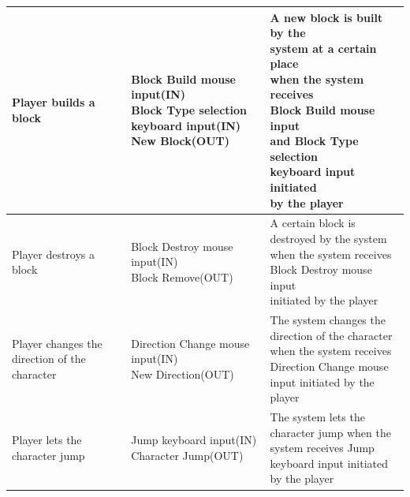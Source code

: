 \documentclass[12pt, titlepage]{article}
\begin{document}
\begin{center}
\begin{longtable}[!bpht]{|m{0.3\linewidth}|m{0.35\linewidth}|m{0.35\linewidth}|}
Player builds a block & \makecell[ml]{Block Build mouse\\ input(IN)\\ Block Type selection\\ keyboard input(IN)\\ New Block(OUT)} & \makecell[ml]{A new block is built by the\\ system at a certain place\\ when the system receives\\Block Build mouse input\\ and Block Type selection\\ keyboard input initiated\\ by the player}\\\hline

Player destroys a block & \makecell[ml]{Block Destroy mouse\\ input(IN)\\ Block Remove(OUT)} & \makecell[ml]{A certain block is\\ destroyed by the system\\ when the system receives\\ Block Destroy mouse input\\ initiated by the player}\\\hline

\makecell[ml]{Player changes the\\ direction of the\\ character} & \makecell[ml]{Direction Change mouse\\ input(IN)\\ New Direction(OUT)} & \makecell[ml]{The system changes the\\ direction of the character\\ when the system receives\\ Direction Change mouse\\ input initiated by the\\ player}\\\hline

\makecell[ml]{Player lets the\\ character jump} & \makecell[ml]{Jump keyboard input(IN)\\ Character Jump(OUT)} & \makecell[ml]{The system lets the\\ character jump when the\\ system receives Jump\\ keyboard input initiated\\ by the player}\\\hline


\end{longtable}
\end{center}
\end{document}
